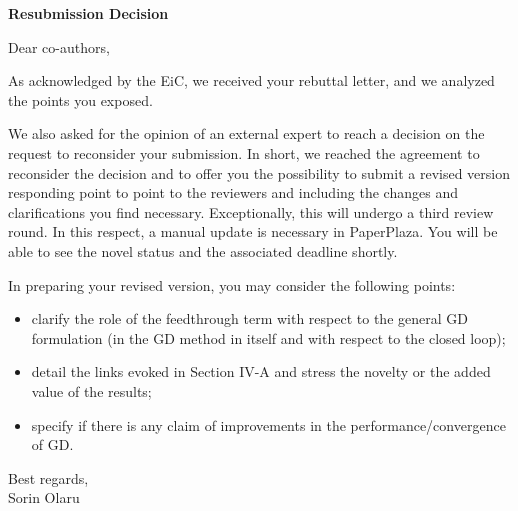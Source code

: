 \thispagestyle{empty}
\setcounter{page}{0}
\begin{center}
    {\LARGE\textbf{Resubmission Decision}}
\end{center}
\begin{flushleft}
    Dear co-authors,

    As acknowledged by the EiC, we received your rebuttal letter, and we analyzed the points you exposed.

    We also asked for the opinion of an external expert to reach a decision on the request to reconsider your submission. In short, we reached the agreement to reconsider the decision and to offer you the possibility to submit a revised version responding point to point to the reviewers and including the changes and clarifications you find necessary. Exceptionally, this will undergo a third review round. In this respect, a manual update is necessary in PaperPlaza. You will be able to see the novel status and the associated deadline shortly. 

    In preparing your revised version, you may consider the following points:
    \begin{itemize}
        \item{%
            clarify the role of the feedthrough term with respect to the general GD formulation (in the GD method in itself and with respect to the closed loop);
        }%
        \item{%
            detail the links evoked in Section IV-A and stress the novelty or the added value of the results; 
        }%
        \item{%
            specify if there is any claim of improvements in the performance/convergence of GD.
        }%
    \end{itemize}

    Best regards,\\[1em]%
    Sorin Olaru
\end{flushleft}
\newpage